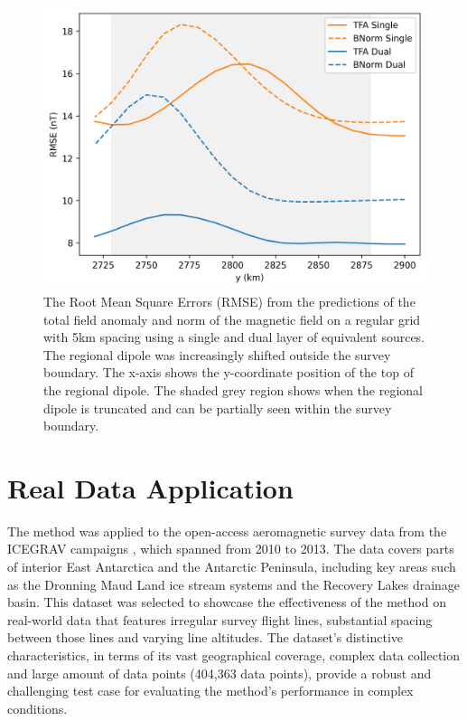 \begin{figure}[!h]
\centering
\includegraphics[width=1\linewidth]{paper/figures/truncated_regional_rmses.png}
\caption{
    The Root Mean Square Errors (RMSE) from the predictions of the total field anomaly and norm of the magnetic field on a regular grid with 5km spacing using a single and dual layer of equivalent sources. The regional dipole was increasingly shifted outside the survey boundary. The x-axis shows the y-coordinate position of the top of the regional dipole. The shaded grey region shows when the regional dipole is truncated and can be partially seen within the survey boundary.
}
\label{fig:truncated_regional_rmses}
\end{figure}

\clearpage
\section{Real Data Application}
\label{sec:real_application}

The method was applied to the open-access aeromagnetic survey data from the ICEGRAV campaigns \citep{ICEGRAV_data}, which spanned from 2010 to 2013. The data covers parts of interior East Antarctica and the Antarctic Peninsula, including key areas such as the Dronning Maud Land ice stream systems and the Recovery Lakes drainage basin. This dataset was selected to showcase the effectiveness of the method on real-world data that features irregular survey flight lines, substantial spacing between those lines and varying line altitudes. The dataset’s distinctive characteristics, in terms of its vast geographical coverage, complex data collection and large amount of data points (404,363 data points), provide a robust and challenging test case for evaluating the method's performance in complex conditions.

